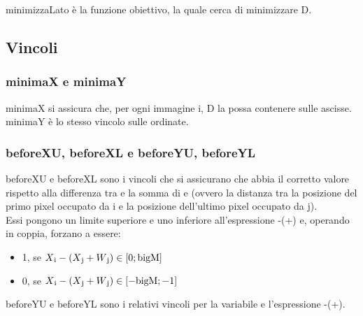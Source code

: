 minimizzaLato è la funzione obiettivo, la quale cerca di minimizzare D.




\subsection{Vincoli}

\subsubsection{minimaX e minimaY}
minimaX si assicura che, per ogni immagine i, D la possa contenere sulle ascisse. \\
minimaY è lo stesso vincolo sulle ordinate.





\newcommand{\Cij}{C\textsubscript{i,j}}

\subsubsection{beforeXU, beforeXL e beforeYU, beforeYL}
beforeXU e beforeXL sono i vincoli che si assicurano che \beforeXij{} abbia il corretto valore rispetto alla differenza tra \Xi{} e la somma di \Xj{} e \Wj{} (ovvero la distanza tra la posizione del primo pixel occupato da i e la posizione dell'ultimo pixel occupato da j). \\
Essi pongono un limite superiore e uno inferiore all'espressione \Xi{}-(\Xj{}+\Wj{}) e, operando in coppia, forzano \beforeXij{} a essere:
\begin{itemize}
	\itemsep0em
	\item 1, se $X\textsubscript{i}{}-(X\textsubscript{j}{}+W\textsubscript{j}{}) \in [0;\text{bigM}]$
	\item 0, se $X\textsubscript{i}{}-(X\textsubscript{j}{}+W\textsubscript{j}{}) \in [-\text{bigM};-1]$
\end{itemize}
\iffalse
/*
Cx variabile d'aiuto per befX; dicono quanto spazio c'è a “sinistra” tra l'inizio di i e la fine di j
* >= 0 intersezione non possibile, 
* <0 intersezione possibile
Cy simile per befY
*/
\fi
beforeYU e beforeYL sono i relativi vincoli per la variabile \beforeYij{} e l'espressione \Yi{}-(\Yj{}+\Hj{}).


